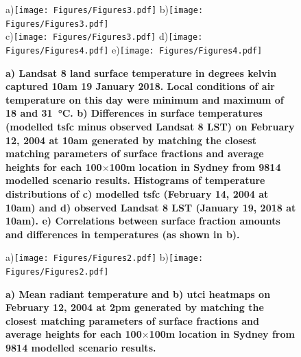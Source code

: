 \documentclass[final,3p,times,authoryear]{elsarticle}
\begin{document}
\begin{figure}  
\centering
a)\texttt{[image: Figures/Figures3.pdf]}
b)\texttt{[image: Figures/Figures3.pdf]}\\
c)\texttt{[image: Figures/Figures3.pdf]}
d)\texttt{[image: Figures/Figures4.pdf]}
e)\texttt{[image: Figures/Figures4.pdf]}
\caption{\bf a) Landsat 8 land surface temperature in degrees kelvin captured 10am 19 January 2018. Local conditions of air temperature on this day were minimum and maximum of 18 and 31\SI{}{\degreeCelsius}. b) Differences in surface temperatures (modelled \gls{tsfc} minus observed Landsat 8 LST) on February 12, 2004 at 10am generated by matching the closest matching parameters of surface fractions and average heights for each 100$\times$100m location in Sydney from 9814 modelled scenario results. Histograms of temperature distributions of c) modelled \gls{tsfc} (February 14, 2004 at 10am) and d) observed Landsat 8 LST (January 19, 2018 at 10am). e) Correlations between surface fraction amounts and differences in temperatures (as shown in b).}
 \label{fig:Sydney-Landsat-LST-19-01-2018}
 \label{fig:Sydney-Landsat-TSFC-LST-19-01-2018}
 \label{fig:Sydney_TSFC14_85}
\end{figure}



\begin{figure}
\centering
a)\texttt{[image: Figures/Figures2.pdf]}
b)\texttt{[image: Figures/Figures2.pdf]}
\caption{\bf a) Mean radiant temperature and b) \gls{utci}  heatmaps on February 12, 2004 at 2pm generated by matching the closest matching parameters of surface fractions and average heights for each 100$\times$100m location in Sydney from 9814 modelled scenario results.  }
 \label{fig:utciSyd}\label{fig:TmrtSyd}
\end{figure}
\end{document}
